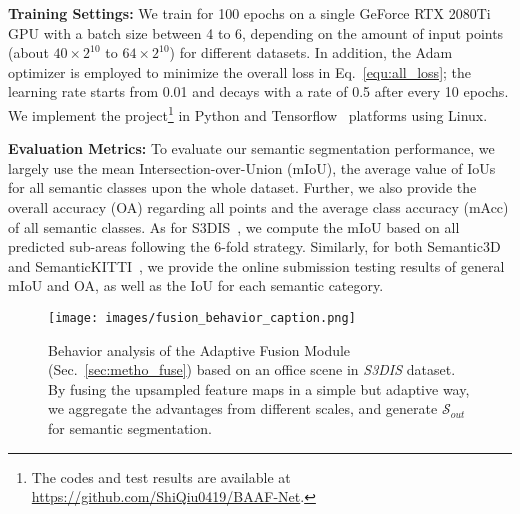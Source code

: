 \documentclass[10pt,twocolumn,letterpaper]{article}
\begin{document}
\vspace{1mm}
\noindent \textbf{Training Settings:}
We train for 100 epochs on a single GeForce RTX 2080Ti GPU with a batch size between 4 to 6, depending on the amount of input points (about $40\times 2^{10}$ to $64\times 2^{10}$) for different datasets. In addition, the Adam~\cite{kingma2014adam} optimizer is employed to minimize the overall loss in Eq.~\ref{equ:all_loss}; the learning rate starts from 0.01 and decays with a rate of 0.5 after every 10 epochs. We implement the project\footnote{The codes and test results are available at \url{https://github.com/ShiQiu0419/BAAF-Net}.} in Python and Tensorflow~\cite{abadi2016tensorflow} platforms using Linux.

\vspace{1mm}
\noindent \textbf{Evaluation Metrics:}
To evaluate our semantic segmentation performance, we largely use the mean Intersection-over-Union (mIoU), the average value of IoUs for all semantic classes upon the whole dataset. Further, we also provide the overall accuracy (OA) regarding all points and the average class accuracy (mAcc) of all semantic classes. As for S3DIS~\cite{armeni2017joint}, we compute the mIoU based on all predicted sub-areas following the 6-fold strategy. Similarly, for both Semantic3D~\cite{hackel2017semantic3d} and SemanticKITTI~\cite{behley2019semantickitti}, we provide the online submission testing results of general mIoU and OA, as well as the IoU for each semantic category.

\begin{figure*}
\begin{center}
\texttt{[image: images/fusion\_behavior\_caption.png]}
\end{center}
\vspace{-5mm}
\captionsetup{font=small}
\caption{Behavior analysis of the Adaptive Fusion Module (Sec.~\ref{sec:metho_fuse}) based on an office scene in \emph{S3DIS} dataset. By fusing the upsampled feature maps in a simple but adaptive way, we aggregate the advantages from different scales, and generate $\mathcal{S}_{out}$ for semantic segmentation.}
\label{fig:visual}
\vspace{-3mm}
\end{figure*}
\end{document}

